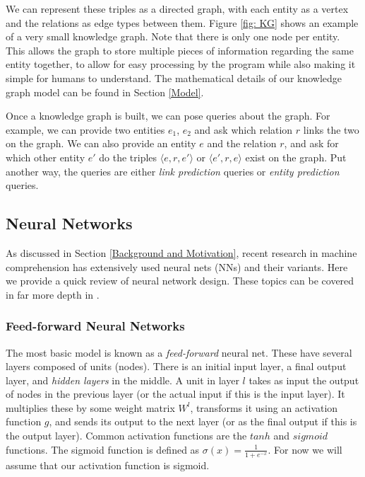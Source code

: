 \documentclass[pageno]{jpaper}
\begin{document}
We can represent these triples as a directed graph, with each entity as a vertex
and the relations as edge types between them. Figure \ref{fig: KG} shows an
example of a very small knowledge graph. Note that there is only one node per
entity. This allows the graph to store multiple pieces of information regarding
the same entity together, to allow for easy processing by the program while also
making it simple for humans to understand. The mathematical details of our
knowledge graph model can be found in Section \ref{Model}.

Once a knowledge graph is built, we can pose queries about the graph. For
example, we can provide two entities $e_1$, $e_2$ and ask which relation $r$
links the two on the graph. We can also provide an entity $e$ and the relation
$r$, and ask for which other entity $e'$ do the triples $\langle e,r,e' \rangle$
or $\langle e',r,e \rangle$ exist on the graph. Put another way, the queries are
either \textit{link prediction} queries or \textit{entity prediction} queries.

\subsection{Neural Networks}
\label{Neural Networks}

As discussed in Section \ref{Background and Motivation}, recent research in
machine comprehension has extensively used neural nets (NNs) and their variants.
Here we provide a quick review of neural network design. These topics can be
covered in far more depth in \cite{Bishop1995, Nielsen2015}.

\subsubsection{Feed-forward Neural Networks}
\label{Feed-forward Neural Networks}

The most basic model is known as a \textit{feed-forward} neural net. These have
several layers composed of units (nodes). There is an initial input layer, a
final output layer, and \textit{hidden layers} in the middle. A unit in layer
$l$ takes as input the output of nodes in the previous layer (or the actual
input if this is the input layer). It multiplies these by some weight matrix
$W^l$, transforms it using an activation function $g$, and sends its output to the
next layer (or as the final output if this is the output layer). Common
activation functions are the $tanh$ and $sigmoid$ functions. The sigmoid
function is defined as $\sigma (x) = \frac{1}{1+e^{-x}}$. For now we will assume
that our activation function is sigmoid.
\end{document}
